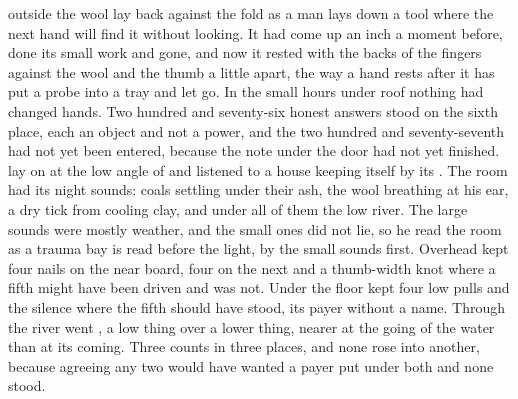 
 outside the wool lay back against the fold as a man lays down a tool where the next hand will find it without looking. It had come up an inch a moment before, done its small work and gone, and now it rested with the backs of the fingers against the wool and the thumb a little apart, the way a hand rests after it has put a probe into a tray and let go. In the small hours under  roof nothing had changed hands. Two hundred and seventy-six honest answers stood on the sixth place, each an object and not a power, and the two hundred and seventy-seventh had not yet been entered, because the note under the door had not yet finished.  lay on  at the low angle of  and listened to a house keeping itself by its . The room had its night sounds: coals settling under their ash, the wool breathing at his ear, a dry tick from cooling clay, and under all of them the low river. The large sounds were mostly weather, and the small ones did not lie, so he read the room as a trauma bay is read before the light, by the small sounds first. Overhead  kept four nails on the near board, four on the next and a thumb-width knot where a fifth might have been driven and was not. Under the floor  kept four low pulls and the silence where the fifth should have stood, its payer without a name. Through  the river went , a low thing over a lower thing, nearer at the going of the water than at its coming. Three counts in three places, and none rose into another, because agreeing any two would have wanted a payer put under both and none stood.

